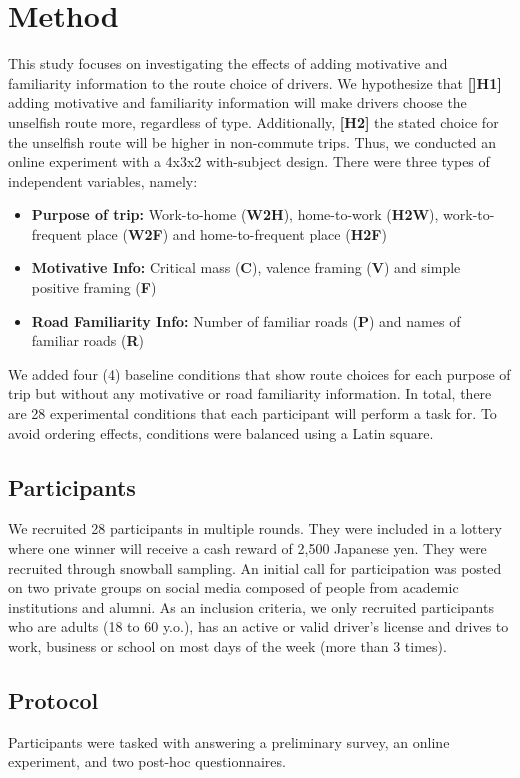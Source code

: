 \section{Method}
This study focuses on investigating the effects of adding motivative and familiarity information to the route choice of drivers. We hypothesize that \textbf{[]H1]} adding motivative and familiarity information will make drivers choose the unselfish route more, regardless of type. Additionally, \textbf{[H2]} the stated choice for the unselfish route will be higher in non-commute trips. Thus, we conducted an online experiment with a 4x3x2 with-subject design. There were three types of independent variables, namely:
\begin{itemize}
    \item \textbf{Purpose of trip:} Work-to-home (\textbf{W2H}), home-to-work (\textbf{H2W}), work-to-frequent place (\textbf{W2F}) and home-to-frequent place (\textbf{H2F})
    \item \textbf{Motivative Info:} Critical mass (\textbf{C}), valence framing (\textbf{V}) and simple positive framing (\textbf{F})
    \item \textbf{Road Familiarity Info:} Number of familiar roads (\textbf{P}) and names of familiar roads (\textbf{R})
\end{itemize}

We added four (4) baseline conditions that show route choices for each purpose of trip but without any motivative or road familiarity information. In total, there are 28 experimental conditions that each participant will perform a task for. To avoid ordering effects, conditions were balanced using a Latin square.

\subsection{Participants}
We recruited 28 participants in multiple rounds. They were included in a lottery where one winner will receive a cash reward of 2,500 Japanese yen. They were recruited through snowball sampling. An initial call for participation was posted on two private groups on social media composed of people from academic institutions and alumni. As an inclusion criteria, we only recruited participants who are adults (18 to 60 y.o.), has an active or valid driver's license and drives to work, business or school on most days of the week (more than 3 times). 

\subsection{Protocol}
Participants were tasked with answering a preliminary survey, an online experiment, and two post-hoc questionnaires. 

